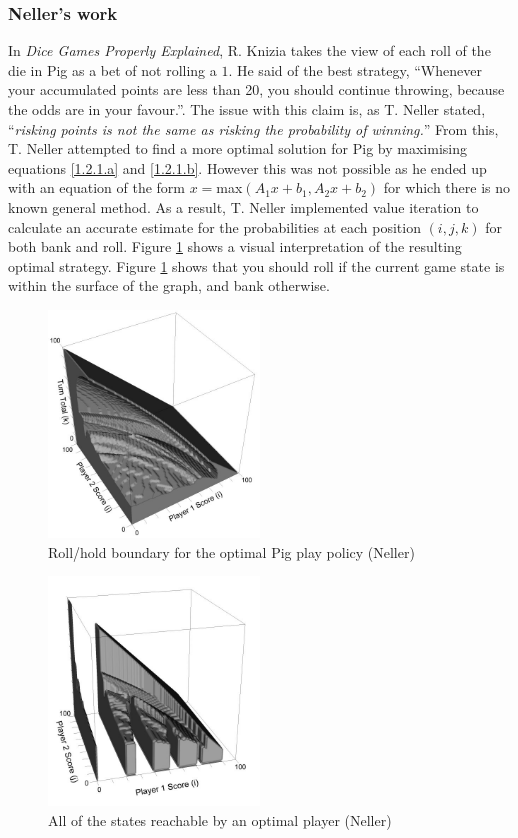 \documentclass[a4paper,titlepage]{article}
\begin{document}
\subsubsection{Neller's work}
In \textit{Dice Games Properly Explained}, R. Knizia takes the view of each roll of the die in Pig as a bet of not rolling a $1$. He said of the best strategy, ``Whenever your accumulated points are less than 20, you should continue throwing, because the odds are in your favour.''\cite{knizia2010dice}. The issue with this claim is, as T. Neller stated, ``\textit{risking points is not the same as risking the probability of winning.}''\cite{neller2004optimal} From this, T. Neller attempted to find a more optimal solution for Pig by maximising equations \ref{1.2.1.a} and \ref{1.2.1.b}. However this was not possible as he ended up with an equation of the form $x=$max$ (A_1 x+b_1,A_2 x+b_2)$ for which there is no known general method. As a result, T. Neller implemented value iteration to calculate an accurate estimate for the probabilities at each position $(i,j,k)$ for both bank and roll. Figure \ref{figure1} shows a visual interpretation of the resulting optimal strategy. Figure \ref{figure1} shows that you should roll if the current game state is within the surface of the graph, and bank otherwise.

\begin{figure}
\centering
\includegraphics[width=0.5\textwidth]{neller_optimal_solution}
\caption{Roll\slash hold boundary for the optimal Pig play policy (Neller)\label{figure1}}
\end{figure}
\begin{figure}
\centering
\includegraphics[width=0.5\textwidth]{neller_optimal_solution_2}
\caption{All of the states reachable by an optimal player (Neller)\label{figure2}}
\end{figure}
\end{document}
